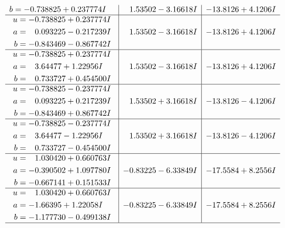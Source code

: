 \documentclass[1p]{elsarticle_modified}
\theoremstyle{definition}
\begin{document}
$$\begin{array}{c|c|c}
\begin{aligned}
b &= -0.738825 + 0.237774 I\end{aligned}
 & \phantom{-}1.53502 - 3.16618 I & -13.8126 + 4.1206 I \\ \hline\begin{aligned}
u &= -0.738825 + 0.237774 I \\
a &= \phantom{-}0.093225 - 0.217239 I \\
b &= -0.843469 - 0.867742 I\end{aligned}
 & \phantom{-}1.53502 - 3.16618 I & -13.8126 + 4.1206 I \\ \hline\begin{aligned}
u &= -0.738825 + 0.237774 I \\
a &= \phantom{-}3.64477 + 1.22956 I \\
b &= \phantom{-}0.733727 + 0.454500 I\end{aligned}
 & \phantom{-}1.53502 - 3.16618 I & -13.8126 + 4.1206 I \\ \hline\begin{aligned}
u &= -0.738825 - 0.237774 I \\
a &= \phantom{-}0.093225 + 0.217239 I \\
b &= -0.843469 + 0.867742 I\end{aligned}
 & \phantom{-}1.53502 + 3.16618 I & -13.8126 - 4.1206 I \\ \hline\begin{aligned}
u &= -0.738825 - 0.237774 I \\
a &= \phantom{-}3.64477 - 1.22956 I \\
b &= \phantom{-}0.733727 - 0.454500 I\end{aligned}
 & \phantom{-}1.53502 + 3.16618 I & -13.8126 - 4.1206 I \\ \hline\begin{aligned}
u &= \phantom{-}1.030420 + 0.660763 I \\
a &= -0.390502 + 1.097780 I \\
b &= -0.667141 + 0.151533 I\end{aligned}
 & -0.83225 - 6.33849 I & -17.5584 + 8.2556 I \\ \hline\begin{aligned}
u &= \phantom{-}1.030420 + 0.660763 I \\
a &= -1.66395 + 1.22058 I \\
b &= -1.177730 - 0.499138 I\end{aligned}
 & -0.83225 - 6.33849 I & -17.5584 + 8.2556 I\\
 \hline 
 \end{array}$$\newpage$$\begin{array}{c|c|c}  

\end{array}$$
\end{document}
